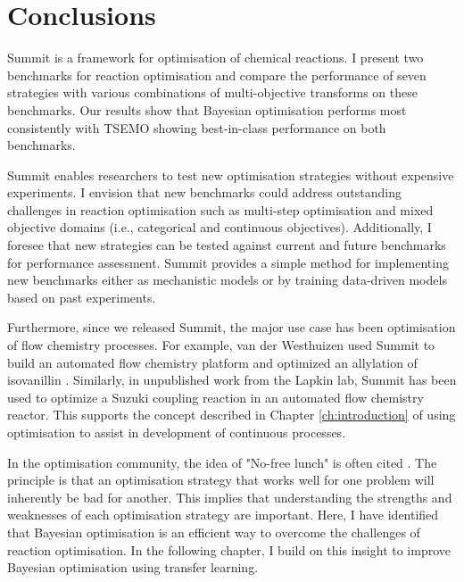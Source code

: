 \section{Conclusions}

Summit is a framework for optimisation of chemical reactions. I present two benchmarks for reaction optimisation and compare the performance of seven strategies with various combinations of multi-objective transforms on these benchmarks. Our results show that Bayesian optimisation performs most consistently with TSEMO showing best-in-class performance on both benchmarks.

Summit enables researchers to test new optimisation strategies without expensive experiments. I envision that new benchmarks could address outstanding challenges in reaction optimisation such as multi-step optimisation \cite{Coley2019, Clayton2020} and mixed objective domains (i.e., categorical and continuous objectives). Additionally, I foresee that new strategies can be tested against current and future benchmarks for performance assessment. Summit provides a simple method for implementing new benchmarks either as mechanistic models or by training data-driven models based on past experiments.

Furthermore, since we released Summit, the major use case has been optimisation of flow chemistry processes. For example, van der Westhuizen used Summit to build an automated flow chemistry platform and optimized an allylation of isovanillin \cite{Van2022}. Similarly, in unpublished work from the Lapkin lab, Summit has been used to optimize a Suzuki coupling reaction in an automated flow chemistry reactor. This supports the concept described in Chapter \ref{ch:introduction} of using optimisation to assist in development of continuous processes.

In the optimisation community, the idea of "No-free lunch" is often cited \cite{Wolpert1997}. The principle is that an optimisation strategy that works well for one problem will inherently be bad for another.  This implies that understanding the strengths and weaknesses of each optimisation strategy are important. Here, I have identified that Bayesian optimisation is an efficient way to overcome the challenges of reaction optimisation. In the following chapter, I build on this insight to improve Bayesian optimisation using transfer learning.
